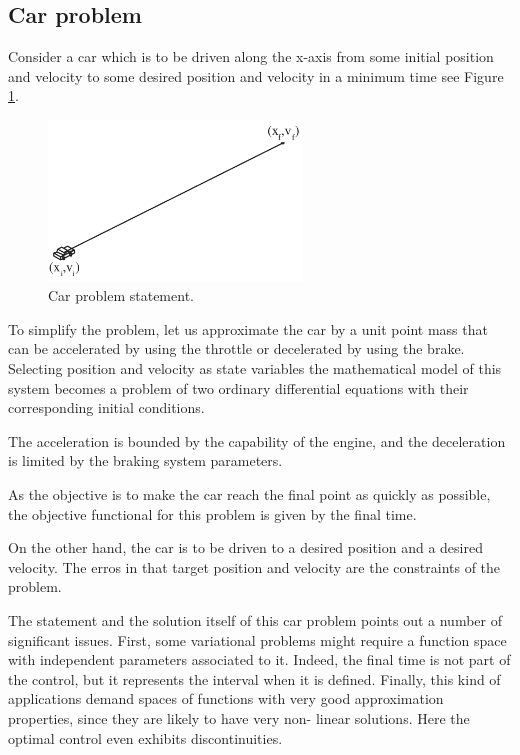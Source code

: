 \subsection*{Car problem}

Consider a car which is to be driven along the x-axis from some initial position and
velocity to some desired position and velocity in a minimum time see Figure \ref{CarProblemFigure}.
 
\begin{figure}[h!]
\begin{center}
\includegraphics[width=0.6\textwidth]{optimal_control/car_problem_statement}
\caption{Car problem statement.}\label{CarProblemFigure}
\end{center}
\end{figure}
 
 
To simplify the problem, let us approximate the car by a unit point mass
that can be accelerated by using the throttle or decelerated by using the
brake. 
Selecting position and velocity as state variables the mathematical
model of this system becomes a problem of two ordinary differential
equations with their corresponding initial conditions.

The acceleration is bounded by the capability of the engine, and the
deceleration is limited by the braking system parameters. 

As the objective is to make the car reach the final point as quickly as
possible, the objective functional for this problem is given by the final time.

On the other hand, the car is to be driven to a desired position and a
desired velocity. The erros in that target position and velocity are the constraints of the problem.

The statement and the solution itself of this car problem points out a
number of significant issues. First, some variational problems might require
a function space with independent parameters associated to it. Indeed, the
final time is not part of the control, but it represents the interval when it is
defined. Finally, this kind of applications demand spaces of functions with
very good approximation properties, since they are likely to have very non-
linear solutions. Here the optimal control even exhibits discontinuities.


